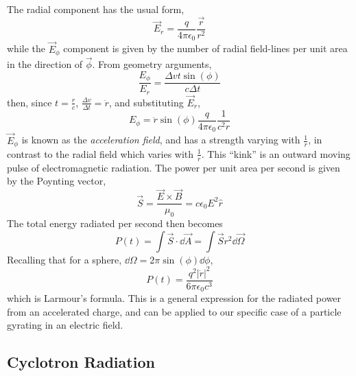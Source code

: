 \documentclass{book}         		                %
\begin{document}
The radial component has the usual form,
\[ \vec{E}_r = \frac{q}{4 \pi \epsilon_0} \frac{\vec{r}}{r^2} \] while
the $\vec{E}_{\phi}$ component is given by the number of radial
field-lines per unit area in the direction of $\vec{\phi}$. From geometry arguments,
\begin{equation}
  \label{eq:9}
  \frac{E_{\phi}}{E_r} = \frac{\Delta v t \sin(\phi)}{c \Delta t}
\end{equation}
then, since $t = \frac{r}{c}$, $\frac{\Delta v}{\Delta t} = \ddot{r}$,
and substituting $\vec{E}_r$,
\begin{equation}
  \label{eq:10}
  E_{\phi} = \ddot{r} \sin(\phi) \frac{q}{4 \pi \epsilon_0} \frac{1}{c^2 r}
\end{equation}
$\vec{E}_{\phi}$ is known as the \emph{acceleration field}, and has a
strength varying with $\frac{1}{r}$, in contrast to the radial field
which varies with $\frac{1}{r}$. This ``kink'' is an outward moving
pulse of electromagnetic radiation. The power per unit area per second
is given by the Poynting vector,
\[ \vec{S} = \frac{\vec{E} \times \vec{B}}{\mu_0} = c \epsilon_0 E^2
\hat{r} \]
The total energy radiated per second then becomes 
\[ P(t) = \int \vec{S} \cdot \dd{\vec{A}} = \int \vec{S} r^2
\dd{\vec{\Omega}} \]
Recalling that for a sphere, $\dd{\Omega} = 2 \pi \sin(\phi) \dd{\phi}$,
\begin{equation}
  \label{eq:11}
  P(t) = \frac{q^2 |\ddot{r}|^2}{6 \pi \epsilon_0 c^3}
\end{equation}
which is Larmour's formula. This is a general expression for the
radiated power from an accelerated charge, and can be applied to our
specific case of a particle gyrating in an electric field.

\subsection{Cyclotron Radiation}
\label{sec:cyclotron-radiation}
\end{document}
